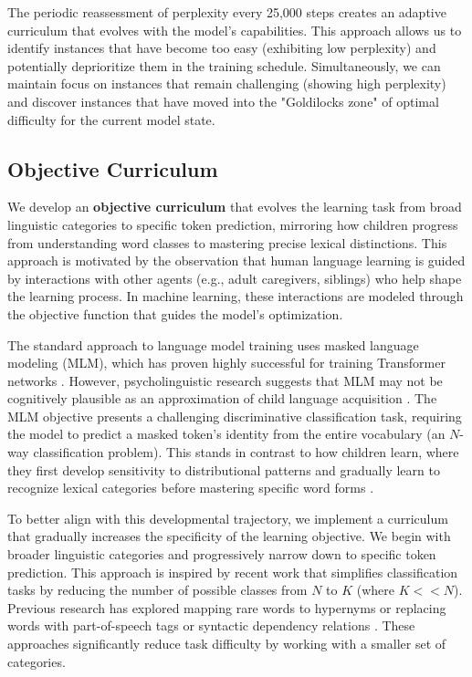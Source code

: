 The periodic reassessment of perplexity every 25,000 steps creates an adaptive curriculum that evolves with the model's capabilities. This approach allows us to identify instances that have become too easy (exhibiting low perplexity) and potentially deprioritize them in the training schedule. Simultaneously, we can maintain focus on instances that remain challenging (showing high perplexity) and discover instances that have moved into the "Goldilocks zone" of optimal difficulty for the current model state.

\subsection{Objective Curriculum}
\label{subsec:objective-cl}

We develop an \textbf{objective curriculum} that evolves the learning task from broad linguistic categories to specific token prediction, mirroring how children progress from understanding word classes to mastering precise lexical distinctions. This approach is motivated by the observation that human language learning is guided by interactions with other agents (e.g., adult caregivers, siblings) who help shape the learning process. In machine learning, these interactions are modeled through the objective function that guides the model's optimization.

The standard approach to language model training uses masked language modeling (MLM), which has proven highly successful for training Transformer networks \cite{devlin2019bert}. However, psycholinguistic research suggests that MLM may not be cognitively plausible as an approximation of child language acquisition \cite{caucheteux2023evidence}. The MLM objective presents a challenging discriminative classification task, requiring the model to predict a masked token's identity from the entire vocabulary (an $N$-way classification problem). This stands in contrast to how children learn, where they first develop sensitivity to distributional patterns and gradually learn to recognize lexical categories before mastering specific word forms \cite{alishahi2010computational, gleitman1990structural}.

To better align with this developmental trajectory, we implement a curriculum that gradually increases the specificity of the learning objective. We begin with broader linguistic categories and progressively narrow down to specific token prediction. This approach is inspired by recent work that simplifies classification tasks by reducing the number of possible classes from $N$ to $K$ (where $K << N$). Previous research has explored mapping rare words to hypernyms \cite{bai2022better} or replacing words with part-of-speech tags \cite{wang2023language} or syntactic dependency relations \cite{cui2022lert}. These approaches significantly reduce task difficulty by working with a smaller set of categories.

